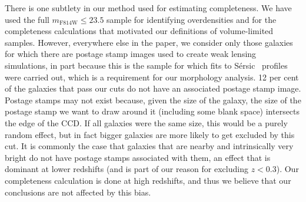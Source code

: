 \documentclass[twocolumn,useAMS,usenatbib]{mn2e}
\newcommand{\sersic}{S\'{e}rsic }
\begin{document}
There is one subtlety in our method used for estimating
completeness. We have used the full $m_\text{F814W}\le23.5$ sample
for identifying
overdensities and for the completeness calculations that motivated our
definitions of volume-limited samples.  However, everywhere else in the paper, we consider only those galaxies for which there are postage stamp
images used to create weak lensing simulations, in part because this is the
sample for which fits to \sersic\ profiles were carried out, which is a
requirement for our morphology analysis.  
12 per cent of the galaxies that pass our cuts do not have an
associated postage stamp image.
Postage stamps may not exist because, given the size of the galaxy,
the size of the postage stamp we want to draw around it (including
some blank space) intersects the edge of the CCD.
If all galaxies were the same size, this would be a purely random effect, but in fact bigger galaxies are more likely to get excluded by this cut. 
It is commonly the case that  galaxies that are nearby and
intrinsically very bright do not have postage stamps associated with
them, an effect that is dominant at lower redshifts (and is part of
our reason for excluding $z<0.3$). 
Our completeness calculation is done at high redshifts, and thus we
believe that our conclusions are not affected by this bias.  

\end{document}
